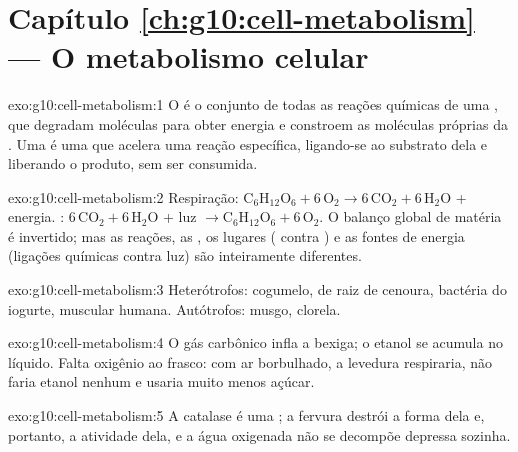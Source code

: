 \section*{Capítulo \ref{ch:g10:cell-metabolism} --- O metabolismo celular}

\begin{solution}{exo:g10:cell-metabolism:1}
O  é o conjunto de todas as reações químicas de uma ,
que degradam moléculas para obter energia e constroem as moléculas
próprias da . Uma  é uma  que acelera uma reação
específica, ligando-se ao substrato dela e liberando o produto, sem ser
consumida.
\end{solution}

\begin{solution}{exo:g10:cell-metabolism:2}
Respiração: $\mathrm{C_6H_{12}O_6} + 6\,\mathrm{O_2} \to
6\,\mathrm{CO_2} + 6\,\mathrm{H_2O}$ + energia. :
$6\,\mathrm{CO_2} + 6\,\mathrm{H_2O}$ + luz $\to \mathrm{C_6H_{12}O_6}
+ 6\,\mathrm{O_2}$. O balanço global de matéria é invertido; mas as
reações, as , os lugares ( contra ) e as
fontes de energia (ligações químicas contra luz) são inteiramente
diferentes.
\end{solution}

\begin{solution}{exo:g10:cell-metabolism:3}
Heterótrofos: cogumelo,  de raiz de cenoura, bactéria do iogurte,
 muscular humana. Autótrofos: musgo, clorela.
\end{solution}

\begin{solution}{exo:g10:cell-metabolism:4}
O gás carbônico infla a bexiga; o etanol se acumula no líquido. Falta
oxigênio ao frasco: com ar borbulhado, a levedura respiraria, não
faria etanol nenhum e usaria muito menos açúcar.
\end{solution}

\begin{solution}{exo:g10:cell-metabolism:5}
A catalase é uma ; a fervura destrói a forma dela e, portanto,
a atividade dela, e a água oxigenada não se decompõe depressa sozinha.
\end{solution}

